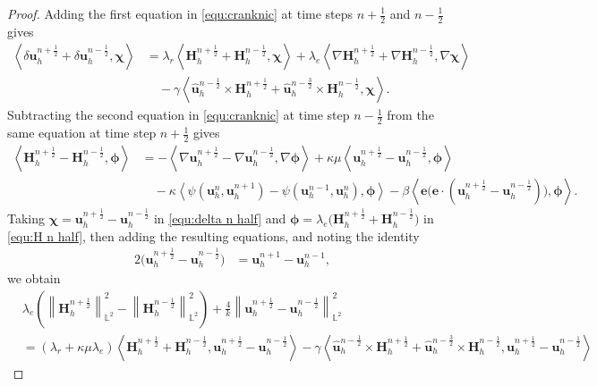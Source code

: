 \documentclass[11pt, reqno]{amsart}
\theoremstyle{definition}
\theoremstyle{remark}
\numberwithin{equation}{section}
\newcommand{\bff}{\boldsymbol}
\newcommand{\bb}{\mathbb}
\newcommand{\norm}[2]{\left\|{#1}\right\|_{#2}}
\newcommand{\inpro}[2]{\left\langle#1,#2\right\rangle}
\begin{document}
\begin{proof}
Adding the first equation in \eqref{equ:cranknic} at time steps $n+\frac{1}{2}$ and $n-\frac{1}{2}$ gives
\begin{align}\label{equ:delta n half}
	\nonumber
	\inpro{\delta \bff{u}_h^{n+\frac{1}{2}} + \delta \bff{u}_h^{n-\frac{1}{2}}}{\bff{\chi}}
	&=
	\lambda_r \inpro{\bff{H}_h^{n+\frac{1}{2}}+\bff{H}_h^{n-\frac{1}{2}}}{\bff{\chi}}
	+
	\lambda_e \inpro{\nabla \bff{H}_h^{n+\frac{1}{2}}+ \nabla \bff{H}_h^{n-\frac{1}{2}}}{\nabla \bff{\chi}}
	\\
	&\quad 
	-
	\gamma \inpro{\widehat{\bff{u}}_h^{n-\frac{1}{2}} \times \bff{H}_h^{n+\frac{1}{2}} + \widehat{\bff{u}}_h^{n-\frac{3}{2}} \times \bff{H}_h^{n-\frac{1}{2}}}{\bff{\chi}}.
\end{align}
Subtracting the second equation in \eqref{equ:cranknic} at time step $n-\frac{1}{2}$ from the same equation at time step $n+\frac{1}{2}$ gives
\begin{align}\label{equ:H n half}
	\nonumber
	\inpro{\bff{H}_h^{n+\frac{1}{2}}-\bff{H}_h^{n-\frac{1}{2}}}{\bff{\phi}}
	&=
	-\inpro{\nabla \bff{u}_h^{n+\frac{1}{2}}- \nabla \bff{u}_h^{n-\frac{1}{2}}}{\nabla \bff{\phi}}
	+
	\kappa\mu \inpro{\bff{u}_h^{n+\frac{1}{2}}-\bff{u}_h^{n-\frac{1}{2}}}{\bff{\phi}}
	\\
	&\quad 
	-
	\kappa \inpro{\psi(\bff{u}_h^n, \bff{u}_h^{n+1})-\psi(\bff{u}_h^{n-1},\bff{u}_h^n)}{\bff{\phi}}
	-
	\beta \inpro{\bff{e}\big(\bff{e}\cdot (\bff{u}_h^{n+\frac12}-\bff{u}_h^{n-\frac12})\big)}{\bff{\phi}}.
\end{align}
Taking $\bff{\chi}=\bff{u}_h^{n+\frac{1}{2}}-\bff{u}_h^{n-\frac{1}{2}}$ in \eqref{equ:delta n half} and $\bff{\phi}= \lambda_e \big(\bff{H}_h^{n+\frac{1}{2}}+ \bff{H}_h^{n-\frac{1}{2}} \big)$ in \eqref{equ:H n half}, then adding the resulting equations, and noting the identity
\begin{align*}
	2 \big(\bff{u}_h^{n+\frac{1}{2}}-\bff{u}_h^{n-\frac{1}{2}} \big)
	&=
	\bff{u}_h^{n+1}-\bff{u}_h^{n-1},
\end{align*}
we obtain
\begin{align*}
	&\lambda_e \left(\norm{\bff{H}_h^{n+\frac{1}{2}}}{\bb{L}^2}^2 - \norm{\bff{H}_h^{n-\frac{1}{2}}}{\bb{L}^2}^2 \right)
	+
	\frac{4}{k} \norm{\bff{u}_h^{n+\frac{1}{2}}- \bff{u}_h^{n-\frac{1}{2}}}{\bb{L}^2}^2
	\\
	&=
	(\lambda_r + \kappa\mu \lambda_e) \inpro{\bff{H}_h^{n+\frac{1}{2}}+\bff{H}_h^{n-\frac{1}{2}}}{\bff{u}_h^{n+\frac{1}{2}}- \bff{u}_h^{n-\frac{1}{2}}}
	-
	\gamma \inpro{\widehat{\bff{u}}_h^{n-\frac{1}{2}} \times \bff{H}_h^{n+\frac{1}{2}} + \widehat{\bff{u}}_h^{n-\frac{3}{2}} \times \bff{H}_h^{n-\frac{1}{2}}}{\bff{u}_h^{n+\frac{1}{2}}-\bff{u}_h^{n-\frac{1}{2}}}

\end{align*}
\end{proof}
\end{document}
